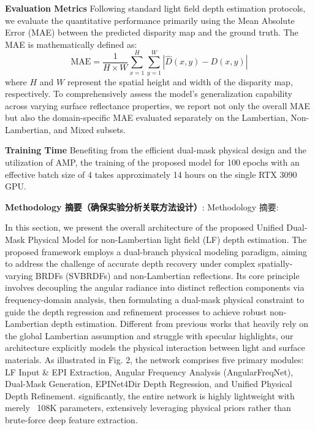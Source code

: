 \documentclass[lettersize,journal]{IEEEtran}
\begin{document}
\textbf{Evaluation Metrics}  
Following standard light field depth estimation protocols, we evaluate the quantitative performance primarily using the Mean Absolute Error (MAE) between the predicted disparity map and the ground truth. The MAE is mathematically defined as:
\begin{equation}
\label{eq:eq26}
\text{MAE} = \frac{1}{H \times W} \sum_{x=1}^{H} \sum_{y=1}^{W} \left| \hat{D}(x,y) - D(x,y) \right|
\end{equation}
where $H$ and $W$ represent the spatial height and width of the disparity map, respectively. To comprehensively assess the model's generalization capability across varying surface reflectance properties, we report not only the overall MAE but also the domain-specific MAE evaluated separately on the Lambertian, Non-Lambertian, and Mixed subsets. 

\textbf{Training Time}  
Benefiting from the efficient dual-mask physical design and the utilization of AMP, the training of the proposed model for 100 epochs with an effective batch size of 4 takes approximately 14 hours on the single RTX 3090 GPU.

\textbf{Methodology 摘要（确保实验分析关联方法设计）}:
Methodology 摘要:

In this section, we present the overall architecture of the proposed Unified Dual-Mask Physical Model for non-Lambertian light field (LF) depth estimation. The proposed framework employs a dual-branch physical modeling paradigm, aiming to address the challenge of accurate depth recovery under complex spatially-varying BRDFs (SVBRDFs) and non-Lambertian reflections. Its core principle involves decoupling the angular radiance into distinct reflection components via frequency-domain analysis, then formulating a dual-mask physical constraint to guide the depth regression and refinement processes to achieve robust non-Lambertian depth estimation. Different from previous works that heavily rely on the global Lambertian assumption and struggle with specular highlights, our architecture explicitly models the physical interaction between light and surface materials. As illustrated in Fig. 2, the network comprises five primary modules: LF Input \& EPI Extraction, Angular Frequency Analysis (AngularFreqNet), Dual-Mask Generation, EPINet4Dir Depth Regression, and Unified Physical Depth Refinement. significantly, the entire network is highly lightweight with merely ~108K parameters, extensively leveraging physical priors rather than brute-force deep feature extraction.
\end{document}
